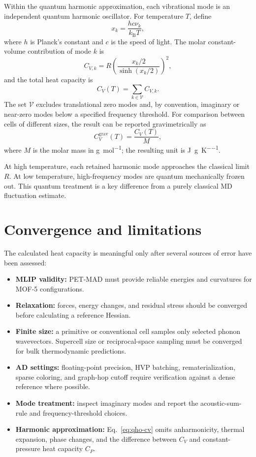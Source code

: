 \documentclass[11pt,a4paper]{article}
\begin{document}
Within the quantum harmonic approximation, each vibrational mode is an independent quantum harmonic oscillator. For temperature $T$, define
\begin{equation}
  x_k = \frac{h c \nu_k}{k_{\mathrm{B}}T},
\end{equation}
where $h$ is Planck's constant and $c$ is the speed of light. The molar constant-volume contribution of mode $k$ is
\begin{equation}
  C_{V,k} = R\left(\frac{x_k/2}{\sinh(x_k/2)}\right)^2,
  \label{eq:qho-cv}
\end{equation}
and the total heat capacity is
\begin{equation}
  C_V(T) = \sum_{k\in\mathcal{V}} C_{V,k}.
\end{equation}
The set $\mathcal{V}$ excludes translational zero modes and, by convention, imaginary or near-zero modes below a specified frequency threshold. For comparison between cells of different sizes, the result can be reported gravimetrically as
\begin{equation}
  C_V^{\mathrm{grav}}(T) = \frac{C_V(T)}{M},
\end{equation}
where $M$ is the molar mass in \si{g\per mol}; the resulting unit is \si{J\per g\per K}.

At high temperature, each retained harmonic mode approaches the classical limit $R$. At low temperature, high-frequency modes are quantum mechanically frozen out. This quantum treatment is a key difference from a purely classical MD fluctuation estimate.

\section{Convergence and limitations}

The calculated heat capacity is meaningful only after several sources of error have been assessed:

\begin{itemize}
  \item \textbf{MLIP validity:} PET-MAD must provide reliable energies and curvatures for MOF-5 configurations.
  \item \textbf{Relaxation:} forces, energy changes, and residual stress should be converged before calculating a reference Hessian.
  \item \textbf{Finite size:} a primitive or conventional cell samples only selected phonon wavevectors. Supercell size or reciprocal-space sampling must be converged for bulk thermodynamic predictions.
  \item \textbf{AD settings:} floating-point precision, HVP batching, rematerialization, sparse coloring, and graph-hop cutoff require verification against a dense reference where possible.
  \item \textbf{Mode treatment:} inspect imaginary modes and report the acoustic-sum-rule and frequency-threshold choices.
  \item \textbf{Harmonic approximation:} Eq.~\eqref{eq:qho-cv} omits anharmonicity, thermal expansion, phase changes, and the difference between $C_V$ and constant-pressure heat capacity $C_P$.
\end{itemize}
\end{document}
